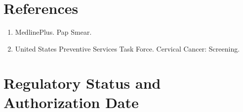 \section*{References}
\begin{enumerate}
  \item MedlinePlus. Pap Smear.
  \item United States Preventive Services Task Force. Cervical Cancer: Screening.
\end{enumerate}

\clearpage


\section*{Regulatory Status and Authorization Date}

\clearpage
